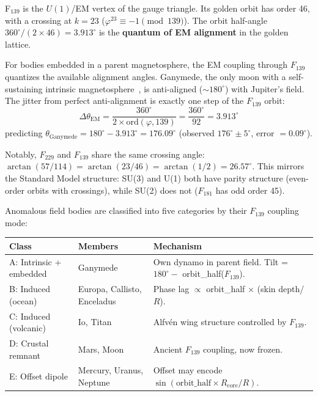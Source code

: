 F$_{139}$ is the $U(1)$/EM vertex of the gauge triangle. Its golden orbit has order 46, with a crossing at $k = 23$ ($\varphi^{23} \equiv -1 \pmod{139}$). The orbit half-angle $360^\circ/(2 \times 46) = 3.913^\circ$ is the \textbf{quantum of EM alignment} in the golden lattice.

For bodies embedded in a parent magnetosphere, the EM coupling through $F_{139}$ quantizes the available alignment angles. Ganymede, the only moon with a self-sustaining intrinsic magnetosphere~\cite{kivelson2002}, is anti-aligned ($\sim 180^\circ$) with Jupiter's field. The jitter from perfect anti-alignment is exactly one step of the $F_{139}$ orbit:
\begin{equation}
    \Delta\theta_{\text{EM}} = \frac{360^\circ}{2 \times \text{ord}(\varphi, 139)} = \frac{360^\circ}{92} = 3.913^\circ
\end{equation}
predicting $\theta_{\text{Ganymede}} = 180^\circ - 3.913^\circ = 176.09^\circ$ (observed $176^\circ \pm 5^\circ$, error $= 0.09^\circ$).

Notably, $F_{229}$ and $F_{139}$ share the same crossing angle: $\arctan(57/114) = \arctan(23/46) = \arctan(1/2) = 26.57^\circ$. This mirrors the Standard Model structure: SU(3) and U(1) both have parity structure (even-order orbits with crossings), while SU(2) does not ($F_{181}$ has odd order 45).

Anomalous field bodies are classified into five categories by their $F_{139}$ coupling mode:
\begin{center}
\renewcommand{\arraystretch}{1.2}
\begin{tabular}{@{}llp{7cm}@{}}
\toprule
\textbf{Class} & \textbf{Members} & \textbf{Mechanism} \\
\midrule
A: Intrinsic + embedded & Ganymede & Own dynamo in parent field. Tilt = $180^\circ -$ orbit\_half($F_{139}$). \\
B: Induced (ocean) & Europa, Callisto, Enceladus & Phase lag $\propto$ orbit\_half $\times$ (skin depth/$R$). \\
C: Induced (volcanic) & Io, Titan & Alfv\'en wing structure controlled by $F_{139}$. \\
D: Crustal remnant & Mars, Moon & Ancient $F_{139}$ coupling, now frozen. \\
E: Offset dipole & Mercury, Uranus, Neptune & Offset may encode $\sin(\text{orbit\_half} \times R_{\text{core}}/R)$. \\
\bottomrule
\end{tabular}
\end{center}

